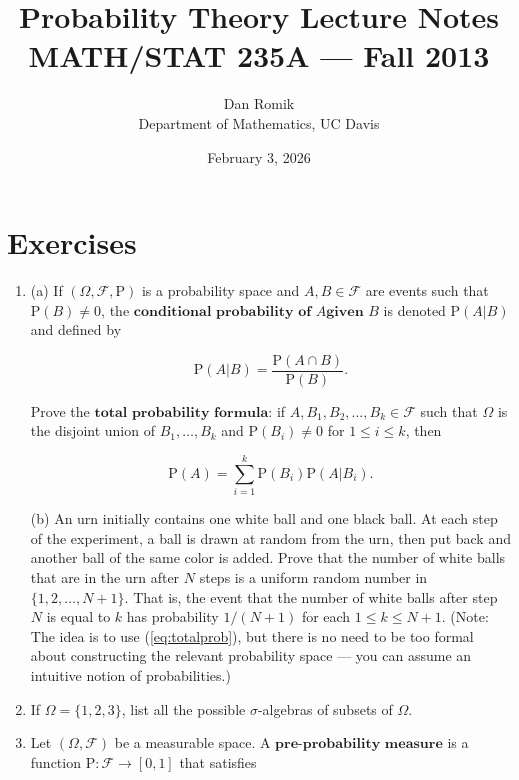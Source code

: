 \documentclass[11pt]{report}
\title{Probability Theory Lecture Notes \\ MATH/STAT 235A --- Fall 2013}
\author{Dan Romik \\ Department of Mathematics, UC Davis}
\date{February 3, 2026}
\providecommand{\cal}{\mathcal}
\theoremstyle{plain}
\theoremstyle{definition}
\begin{document}
\maketitle
{}
\tableofcontents

\chapter*{Exercises}

\begin{enumerate}[label=\arabic*.]
\item (a) If $(\Omega, {\cal F}, \mathrm{P})$ is a
probability space and $A, B\in {\cal F}$ are events
such that $\mathrm{P}(B)\neq 0$, the
$\textbf{conditional probability of } A \textbf{
given } B$
is denoted $\mathrm{P}(A | B)$ and defined by

\[
\mathrm{P}(A | B) = \frac{\mathrm{P}(A \cap B)}{\mathrm{P}(B)}.
\]

Prove the $\textbf{total probability formula:}$ if
$A,B_1,B_2,\ldots,B_k \in {\cal F}$ such that $\Omega$
is the disjoint union of $B_1,\ldots, B_k$ and
$\mathrm{P}(B_i) \neq 0$ for $1\le i\le k$, then

\begin{equation*}
\tag{31}\label{eq:totalprob}
\mathrm{P}(A) = \sum_{i=1}^k \mathrm{P}(B_i) \mathrm{P}(A | B_i).
\end{equation*}

(b) An urn initially contains one white ball and one
black ball. At each step of the experiment, a ball is
drawn at random from the urn, then put back and
another ball of the same color is added. Prove that
the number of white balls that are in the urn after
$N$ steps is a uniform random number in
$\{1,2,\ldots,N+1\}$. That is, the event that the
number of white balls after step $N$ is equal to $k$
has probability $1/(N+1)$ for each $1\le k\le N+1$.
(Note: The idea is to use (\ref{eq:totalprob}), but there
is no need to be too formal about constructing the
relevant probability space --- you can assume an
intuitive notion of probabilities.)

\item If $\Omega=\{1,2,3\}$, list all the possible
$\sigma$-algebras of subsets of $\Omega$.

\item Let $(\Omega, {\cal F})$ be a measurable space. A
$\textbf{pre-probability measure}$ is a function
$\mathrm{P}:{\cal F}\to [0,1]$ that satisfies


\end{enumerate}
\end{document}
